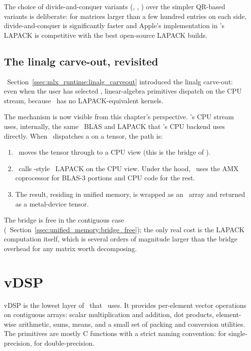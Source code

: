 The choice of divide-and-conquer variants (,
, ) over the simpler QR-based variants is
deliberate: for matrices larger than a few hundred entries on each
side, divide-and-conquer is significantly faster and Apple's
implementation in \Accelerate's LAPACK is competitive with the best
open-source LAPACK builds.

\subsection{The linalg carve-out, revisited}
\label{ssec:accelerate:linalg_carveout}

~Section~\ref{ssec:mlx_runtime:linalg_carveout}
introduced the linalg carve-out: even when the user has selected
, linear-algebra primitives dispatch on the CPU
stream, because \Metal\ has no LAPACK-equivalent kernels.

The mechanism is now visible from this chapter's perspective.
\MLX's CPU stream uses, internally, the same \Accelerate\ BLAS and
LAPACK that \Lucid's CPU backend uses directly. When \Lucid\
dispatches a  on a  tensor, the path is:

\begin{enumerate}
  \item \Lucid\ moves the tensor through  to a
    CPU view (this is the bridge of \chref{ch:unified_memory}).
  \item \Lucid\ calls -style \Accelerate\ LAPACK
    on the CPU view. Under the hood, \Accelerate\ uses the AMX
    coprocessor for BLAS-3 portions and CPU code for the rest.
  \item The result, residing in unified memory, is wrapped as an
    \MLX\ array and returned as a metal-device tensor.
\end{enumerate}

The bridge is free in the contiguous case
(~Section~\ref{ssec:unified_memory:bridge_free});
the only real cost is the LAPACK computation itself, which is
several orders of magnitude larger than the bridge overhead for any
matrix worth decomposing.

\section{vDSP}
\label{sec:accelerate:vdsp}

vDSP is the lowest layer of \Accelerate\ that \Lucid\ uses. It
provides per-element vector operations on contiguous arrays: scalar
multiplication and addition, dot products, element-wise arithmetic,
sums, means, and a small set of packing and conversion utilities.
The primitives are mostly C functions with a strict naming
convention:  for single-precision,
 for double-precision.

